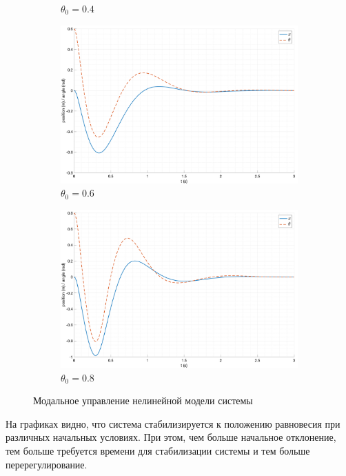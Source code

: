 \begin{figure}[ht!]
\begin{subfigure}[b]{0.45\textwidth}
        \caption{$\theta_0 = 0.4$}
    \end{subfigure}
    \begin{subfigure}[b]{0.45\textwidth}
        \includegraphics[width=\textwidth]{media/plots/nonmodal_control/out_3.png}
        \caption{$\theta_0 = 0.6$}
    \end{subfigure}
    \begin{subfigure}[b]{0.45\textwidth}
        \includegraphics[width=\textwidth]{media/plots/nonmodal_control/out_4.png}
        \caption{$\theta_0 = 0.8$}
    \end{subfigure}
    \caption{Модальное управление нелинейной модели системы}
    \label{fig:nonmodal_control_initials}
\end{figure}

На графиках видно, что система стабилизируется к положению равновесия при различных начальных условиях. При этом, 
чем больше начальное отклонение, тем больше требуется времени для стабилизации системы и тем больше перерегулирование. 

